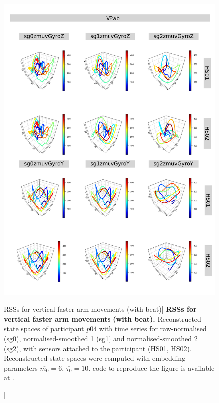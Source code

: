\begin{figure}
\centering
\includegraphics[height=0.8\textheight]{rss_VFwb_p04}
\caption
	[RSSs for vertical faster arm movements (with beat)]{
	{\bf RSSs for vertical faster arm movements (with beat).}
	Reconstructed state spaces of participant $p04$
	with time series for raw-normalised (sg0), 
	normalised-smoothed 1 (sg1) and 
	normalised-smoothed 2 (sg2), 
	with sensors attached to the participant (HS01, HS02).
	Reconstructed state spaces were computed with 
	embedding parameters $\overline{m_0}=6$, $\overline{\tau_0}=10$.
		\R code to reproduce the figure is available at 
		.
        }
     \label{fig:rss_VFwb_p04}
\end{figure}






